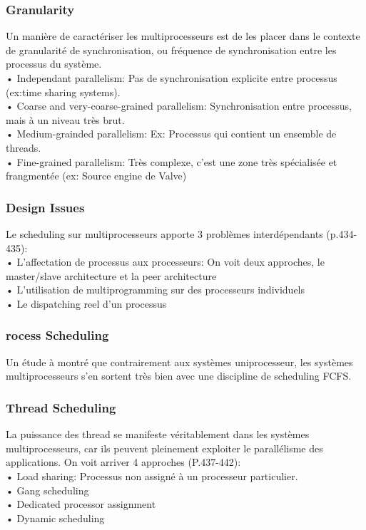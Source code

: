 \subsubsection{Granularity}
Un manière de caractériser les multiprocesseurs est de les placer dans le contexte de granularité de synchronisation, ou fréquence de synchronisation entre les processus du système. \\
• Independant parallelism: Pas de synchronisation explicite entre processus (ex:time sharing systems). \\
• Coarse and very-coarse-grained parallelism: Synchronisation entre processus, mais à un niveau très brut. \\
• Medium-grainded parallelism: Ex: Processus qui contient un ensemble de threads.\\
• Fine-grained parallelism: Très complexe, c’est une zone très spécialisée et frangmentée (ex: Source engine de Valve)
\subsubsection{Design Issues}
Le scheduling sur multiprocesseurs apporte 3 problèmes interdépendants (p.434-435):\\
• L’affectation de processus aux processeurs: On voit deux approches, le master/slave architecture et la peer architecture\\
• L’utilisation de multiprogramming sur des processeurs individuels\\
• Le dispatching reel d’un processus
\subsubsection{rocess Scheduling}
Un étude à montré que contrairement aux systèmes uniprocesseur, les systèmes multiprocesseurs s’en sortent très bien avec une discipline de scheduling FCFS.
\subsubsection{Thread Scheduling}
La puissance des thread se manifeste véritablement dans les systèmes multiprocesseurs, car ils peuvent pleinement exploiter le parallélisme des applications. On voit arriver 4 approches (P.437-442):\\
• Load sharing: Processus non assigné à un processeur particulier. \\
• Gang scheduling\\
• Dedicated processor assignment\\
• Dynamic scheduling
